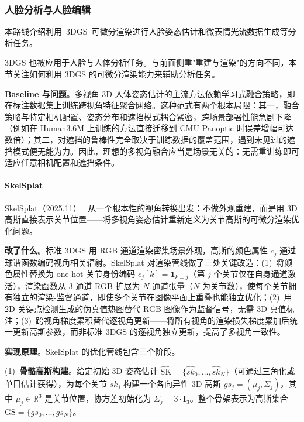 \subsubsection{人脸分析与人脸编辑}

本路线介绍利用~3DGS~可微分渲染进行人脸姿态估计和微表情光流数据生成等分析任务。

3DGS 也被应用于人脸与人体分析任务。与前面侧重"重建与渲染"的方向不同，本节关注如何利用 3DGS 的可微分渲染能力来辅助分析任务。

\textbf{Baseline 与问题}。多视角 3D 人体姿态估计的主流方法依赖学习式融合策略，即在标注数据集上训练跨视角特征聚合网络。这种范式有两个根本局限：其一，融合策略与特定相机配置、姿态分布和遮挡模式耦合紧密，跨场景部署性能急剧下降（例如在 Human3.6M 上训练的方法直接迁移到 CMU Panoptic 时误差增幅可达数倍）；其二，对遮挡的鲁棒性完全取决于训练数据的覆盖范围，遇到未见过的遮挡模式便无能为力。因此，理想的多视角融合应当是场景无关的：无需重训练即可适应任意相机配置和遮挡条件。

\paragraph{SkelSplat}

SkelSplat（2025.11）~\cite{2511_08294} 从一个根本性的视角转换出发：不做外观重建，而是用 3D 高斯直接表示关节位置——将多视角姿态估计重新定义为关节高斯的可微分渲染优化问题。

\textbf{改了什么}。标准 3DGS 用 RGB 通道渲染密集场景外观，高斯的颜色属性 $c_j$ 通过球谐函数编码视角相关辐射。SkelSplat 对渲染管线做了三处关键改造：(1)~将颜色属性替换为 one-hot 关节身份编码 $c_j[k] = \mathbf{1}_{k=j}$（第 $j$ 个关节仅在自身通道激活），渲染函数从 3 通道 RGB 扩展为 $N$ 通道张量（$N$ 为关节数），使每个关节拥有独立的渲染-监督通道，即使多个关节在图像平面上重叠也能独立优化；(2)~用 2D 关键点检测生成的伪真值热图替代 RGB 图像作为监督信号，无需 3D 真值标注；(3)~跨视角梯度累积替代逐视角更新——将所有视角的渲染损失梯度累加后统一更新高斯参数，而非标准 3DGS 的逐视角独立更新，提高了多视角一致性。

\textbf{实现原理}。SkelSplat 的优化管线包含三个阶段。

(1)~\textbf{骨骼高斯构建}。给定初始 3D 姿态估计 $\hat{\mathrm{SK}} = \{\hat{sk}_0, \dots, \hat{sk}_N\}$（可通过三角化或单目估计获得），为每个关节 $sk_j$ 构建一个各向异性 3D 高斯 $gs_j = (\mu_j, \Sigma_j)$，其中 $\mu_j \in \mathbb{R}^3$ 是关节位置，协方差初始化为 $\Sigma_j = 3 \cdot \mathbf{I}_3$。整个骨架表示为高斯集合 $\mathrm{GS} = \{gs_0, \dots, gs_N\}$。

